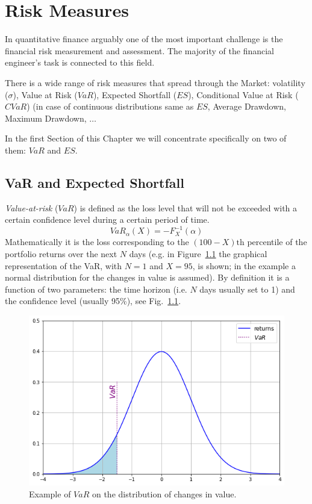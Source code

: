 \chapter{Risk Measures}
\label{var-and-credit-risk}

In quantitative finance arguably one of the most important challenge is the financial risk measurement and assessment.
The majority of the financial engineer’s task is connected to this field.

There is a wide range of risk measures that spread through the Market: volatility ($\sigma$), Value at Risk ($VaR$), Expected Shortfall ($ES$), Conditional Value at Risk ($CVaR$) (in case of continuous distributions same as $ES$, Average Drawdown, Maximum Drawdown, $\ldots$

In the first Section of this Chapter we will concentrate specifically on two of them: $VaR$ and $ES$.

\section{VaR and Expected Shortfall}
\label{value-at-risk}

\emph{Value-at-risk} ($VaR$) is defined as the loss level that will not be exceeded with a certain confidence level during a certain period of time.
\begin{equation}
VaR_{\alpha}(X) = -F^{-1}_X(\alpha)
\label{eq:var}
\end{equation}
Mathematically it is the loss corresponding to the $(100-X)\textrm{th}$ percentile of the portfolio returns over the next $N$ days (e.g. in Figure~\ref{fig:var_loss} the graphical representation of the VaR, with $N=1$ and $X=95$, is shown; in the example a normal distribution for the changes in value is assumed). By definition it is a function of two parameters: the time horizon (i.e. $N$ days usually set to 1) and the confidence level (usually 95\%), see Fig.~\ref{fig:var_loss}. 

\begin{figure}[htb]
\centering
\includegraphics[width=0.6\linewidth]{figures/95_var}
\caption{Example of $VaR$ on the distribution of changes in value.}
\label{fig:var_loss}
\end{figure}

